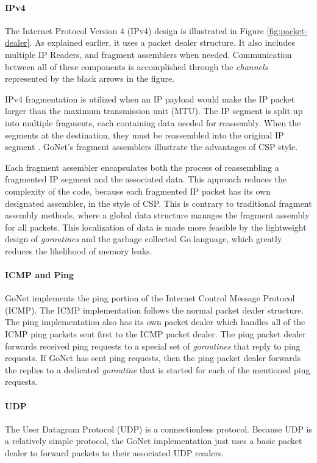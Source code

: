 \documentclass[twocolumn,10pt]{article}
\begin{document}
\paragraph{IPv4}
The Internet Protocol Version 4 (IPv4) design is illustrated in Figure \ref{fig:packet-dealer}. As explained earlier, it uses a packet dealer structure. It also includes multiple IP Readers, and fragment assemblers when needed. Communication between all of these components is accomplished through the \textit{channels} represented by the black arrows in the figure. 

IPv4 fragmentation is utilized when an IP payload would make the IP packet larger than the maximum transmission unit (MTU). The IP segment is split up into multiple fragments, each containing data needed for reassembly. When the segments at the destination, they must be reassembled into the original IP segment \cite{IPRFC}.
GoNet's fragment assemblers illustrate the advantages of CSP style.

Each fragment assembler encapsulates both the process of reassembling a fragmented IP segment and the associated data. This approach reduces the complexity of the code, because each fragmented IP packet has its own designated assembler, in the style of CSP. This is contrary to traditional fragment assembly methods, where a global data structure manages the fragment assembly for all packets. This localization of data is made more feasible by the lightweight design of \textit{goroutines} and the garbage collected Go language, which greatly reduces the likelihood of memory leaks.

\paragraph{ICMP and Ping}
GoNet implements the ping portion of the Internet Control Message Protocol (ICMP). The ICMP implementation follows the normal packet dealer structure. The ping implementation also has its own packet dealer which handles all of the ICMP ping packets sent first to the ICMP packet dealer. The ping packet dealer forwards received ping requests to a special set of \textit{goroutines} that reply to ping requests. If GoNet has sent ping requests, then the ping packet dealer forwards the replies to a dedicated \textit{goroutine} that is started for each of the mentioned ping requests.

\paragraph{UDP}
The User Datagram Protocol (UDP) is a connectionless protocol. Because UDP is a relatively simple protocol, the GoNet implementation just uses a basic packet dealer to forward packets to their associated UDP readers.
\end{document}
